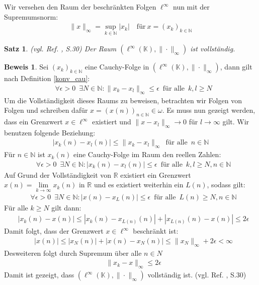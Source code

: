 \documentclass[10pt,a4paper]{article}
\theoremstyle{plain}
\newtheorem{satz}{Satz}[section]
\newenvironment{sa}{\begin{shaded}\begin{satz}}{\end{satz}\end{shaded}}
\theoremstyle{definition}
\theoremstyle{nonumberplain}
\newtheorem{beweis}{Beweis}
\newenvironment{bew}{\begin{beweis}}{\end{beweis}}
\newcommand{\N}{\mathbb{N}}
\newcommand{\R}{\mathbb{R}}
\newcommand{\K}{\mathbb{K}}
\begin{document}
\noindent Wir versehen den Raum der beschränkten Folgen $\ell^\infty$ nun mit der  Supremumsnorm:
\begin{align*}
\|x\|_\infty = \sup_{k \in \N}{|x_k|} \quad \text{für} \: x = {(x_k)}_{k \in \N}
\end{align*}
\begin{sa}
(vgl. Ref. \cite{Clason}, S.30) Der Raum $(\ell^\infty(\K), \|\cdot\|_\infty)$ ist vollständig.
\end{sa}
\begin{bew}
Sei ${(x_k)}_{k \in \N}$ eine Cauchy-Folge in $(\ell^\infty(\K), \|\cdot\|_\infty)$, dann gilt nach Definition \hyperref[konv_cau]{\ref*{konv_cau}}:
\begin{align*}
& \forall \epsilon > 0 \enspace \exists N \in \N : \|x_k - x_l\|_\infty \leq \epsilon \enspace \text{für alle} \enspace k,l \geq N
\end{align*}
Um die Vollständigkeit dieses Raums zu beweisen, betrachten wir Folgen von Folgen und schreiben dafür $x = {(x(n))}_{n \in \N} \in \omega$.  Es muss nun gezeigt werden, dass ein Grenzwert $x \in \ell^\infty$ existiert und $\|x - x_l\|_\infty \rightarrow 0$ für $l \rightarrow \infty$ gilt. Wir benutzen folgende Beziehung:
\begin{align*}
|x_k(n) - x_l(n)| \leq \|x_k - x_l\|_\infty \enspace \text{für alle} \enspace  n \in \N
\end{align*}
Für $n \in \N$ ist $x_k(n)$ eine Cauchy-Folge im Raum den reellen Zahlen:
\begin{align*}
& \forall \epsilon > 0 \enspace \exists N \in \N : |x_k(n) - x_l(n)| \leq \epsilon \enspace \text{für alle} \enspace k,l \geq N, n \in \N
\end{align*}
Auf Grund der Vollständigkeit von $\R$ existiert ein Grenzwert $x(n) = \lim\limits_{k \to \infty}{x_k(n)}$ in $\R$ und es existiert weiterhin ein $L(n)$, sodass gilt:
\begin{align*}
& \forall \epsilon > 0 \enspace \exists N \in \N : |x(n) - x_L(n)| \leq \epsilon \enspace \text{für alle} \enspace L(n) \geq N, n \in \N
\end{align*}
Für alle $k \geq N$ gilt dann:
\begin{align*}
& |x_k(n) - x(n)| \leq |x_k(n) - x_{L(n)}(n)| + |x_{L(n)}(n) - x(n)| \leq 2\epsilon  
\end{align*}
Damit folgt, dass der Grenzwert $x \in \ell^\infty$ beschränkt ist:
\begin{align*}
& |x(n)| \leq |x_N(n)| + | x(n) - x_N(n)| \leq \|x_N\|_\infty + 2\epsilon < \infty
\end{align*}
Desweiteren folgt durch Supremum über alle $n \in N$ 
\begin{align*}
& \|x_k - x\|_\infty \leq 2\epsilon 
\end{align*}
Damit ist gezeigt, dass $(\ell^\infty(\K), \|\cdot\|_\infty)$ vollständig ist. (vgl. Ref. \cite{Clason}, S.30)
\end{bew}
\end{document}
